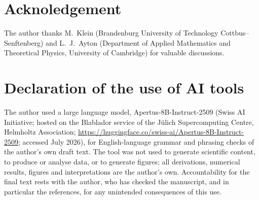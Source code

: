 \documentclass[lineno]{JFM-FLM_Au}
\begin{document}
\section{Acknoledgement}
The author thanks M.~Klein (Brandenburg
University of Technology Cottbus--Senftenberg) and L.~J.~Ayton (Department of
Applied Mathematics and Theoretical Physics, University of Cambridge) for
valuable discussions.

\section{Declaration of the use of AI tools}The author used a large
language model, Apertus-8B-Instruct-2509 \citep{swissai2025apertus} (Swiss AI
Initiative; hosted on the Blablador service of the J\"ulich Supercomputing
Centre, Helmholtz Association; \url{https://huggingface.co/swiss-ai/Apertus-8B-Instruct-2509};
accessed July 2026), for English-language grammar and phrasing checks of the
author's own draft text. The tool was not used to generate scientific content,
to produce or analyse data, or to generate figures; all derivations, numerical
results, figures and interpretations are the author's own. Accountability for
the final text rests with the author, who has checked the manuscript, and in
particular the references, for any unintended consequences of this use.



\end{document}
